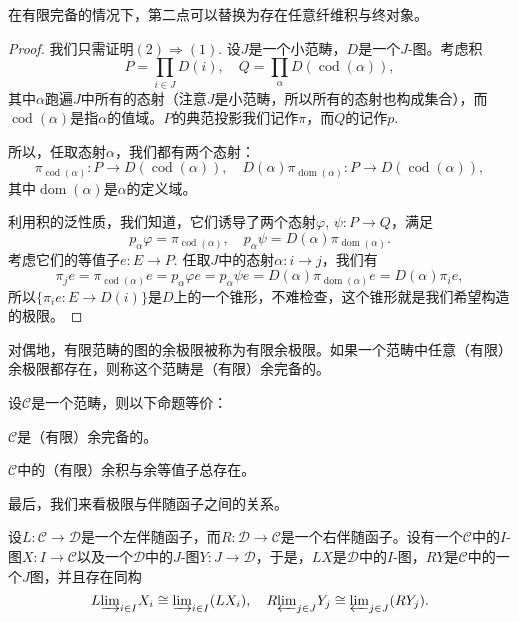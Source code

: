 在有限完备的情况下，第二点可以替换为存在任意纤维积与终对象。

\begin{proof}
我们只需证明$(2)\Rightarrow (1)$. 设$J$是一个小范畴，$D$是一个$J$-图。考虑积
\[
	P=\prod_{i\in J}D(i),\quad Q=\prod_{\alpha}D(\operatorname{cod}(\alpha)),
\]
其中$\alpha$跑遍$J$中所有的态射（注意$J$是小范畴，所以所有的态射也构成集合），而$\operatorname{cod}(\alpha)$是指$\alpha$的值域。$P$的典范投影我们记作$\pi$，而$Q$的记作$p$.

所以，任取态射$\alpha$，我们都有两个态射：
\[
	\pi_{\operatorname{cod}(\alpha)}:P\to D(\operatorname{cod}(\alpha)),\quad D(\alpha)\pi_{\operatorname{dom}(\alpha)}:P\to D(\operatorname{cod}(\alpha)),
\]
其中$\operatorname{dom}(\alpha)$是$\alpha$的定义域。

利用积的泛性质，我们知道，它们诱导了两个态射$\varphi$, $\psi:P\to Q$，满足
\[
	p_\alpha \varphi =\pi_{\operatorname{cod}(\alpha)},\quad p_\alpha\psi=D(\alpha)\pi_{\operatorname{dom}(\alpha)}.
\]
考虑它们的等值子$e:E\to P$. 任取$J$中的态射$\alpha:i\to j$，我们有
\[
	\pi_j e = \pi_{\operatorname{cod}(\alpha)}e=p_\alpha \varphi e=p_\alpha \psi e=D(\alpha)\pi_{\operatorname{dom}(\alpha)}e=D(\alpha)\pi_{i}e,
\]
所以$\{\pi_i e:E\to D(i)\}$是$D$上的一个锥形，不难检查，这个锥形就是我们希望构造的极限。
\end{proof}

\begin{para}
对偶地，有限范畴的图的余极限被称为有限余极限。如果一个范畴中任意（有限）余极限都存在，则称这个范畴是（有限）余完备的。
\end{para}

\begin{thm}\label{yuwanbei}
设$\mathcal{C}$是一个范畴，则以下命题等价：
\begin{compactenum}[~~~~(1)]
\item $\mathcal{C}$是（有限）余完备的。
\item $\mathcal{C}$中的（有限）余积与余等值子总存在。
\end{compactenum}
\end{thm}

最后，我们来看极限与伴随函子之间的关系。

\begin{pro}
	设$L:\mathcal{C}\to \mathcal{D}$是一个左伴随函子，而$R:\mathcal{D}\to \mathcal{C}$是一个右伴随函子。设有一个$\mathcal{C}$中的$I$-图$X:I\to \mathcal{C}$以及一个$\mathcal{D}$中的$J$-图$Y:J\to \mathcal{D}$，于是，$LX$是$\mathcal{D}$中的$I$-图，$RY$是$\mathcal{C}$中的一个$J$图，并且存在同构
	\[
		L{\varinjlim}_{i\in I} X_i\cong {\varinjlim}_{i\in I} (LX_i),\quad
		R{\varprojlim}_{j\in J} Y_j\cong {\varprojlim}_{j\in J} (RY_j).
	\]
\end{pro}
	
